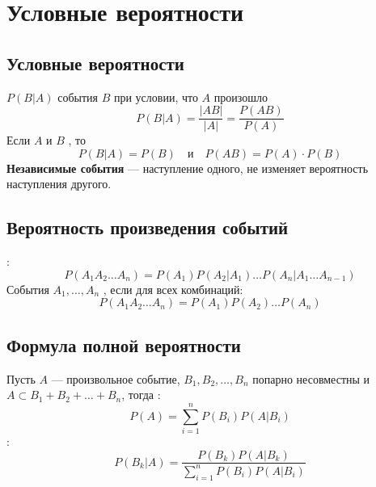 \section{Условные вероятности}

\subsection{Условные вероятности}
 $P(B|A)$ события $B$ при условии, что $A$ произошло
\begin{equation*}
    P(B|A)=\frac{|AB|}{|A|}=\frac{P(AB)}{P(A)}
\end{equation*}
Если $A$ и $B$ , то
\begin{equation*}
    P(B|A)=P(B) \quad \text{и} \quad P(AB)=P(A) \cdot P(B)
\end{equation*}
\textbf{Независимые события} --- наступление одного, не изменяет вероятность наступления другого.

\subsection{Вероятность произведения событий}
:
\begin{equation*}
    P(A_1 A_2 \ldots A_n) = P(A_1) P(A_2 | A_1) \ldots P(A_n | A_1 \ldots A_{n-1})
\end{equation*}
События $A_1, \ldots, A_n$ , если для всех комбинаций:
\begin{equation*}
    P(A_1 A_2 \ldots A_n) = P(A_1) P(A_2) \ldots P(A_n)
\end{equation*}

\subsection{Формула полной вероятности}
Пусть $A$ --- произвольное событие, $B_1, B_2, \ldots, B_n$ попарно несовместны и
$A \subset B_1 + B_2 + \ldots + B_n$, тогда :
\begin{equation*}
    P(A) = \sum_{i = 1}^n P(B_i) P(A|B_i)
\end{equation*}
:
\begin{equation*}
    P(B_k|A) = \frac{P(B_k)P(A|B_k)}{\sum_{i = 1}^n P(B_i) P(A|B_i)}
\end{equation*}